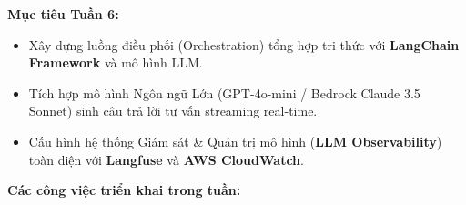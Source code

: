 \vspace{0.5em}\noindent\textbf{Mục tiêu Tuần 6:}

\begin{itemize}
\tightlist
\item
  Xây dựng luồng điều phối (Orchestration) tổng hợp tri thức với
  \textbf{LangChain Framework} và mô hình LLM.
\item
  Tích hợp mô hình Ngôn ngữ Lớn (GPT-4o-mini / Bedrock Claude 3.5
  Sonnet) sinh câu trả lời tư vấn streaming real-time.
\item
  Cấu hình hệ thống Giám sát \& Quản trị mô hình (\textbf{LLM
  Observability}) toàn diện với \textbf{Langfuse} và \textbf{AWS
  CloudWatch}.
\end{itemize}

\vspace{0.5em}\noindent\textbf{Các công việc triển khai trong tuần:}

